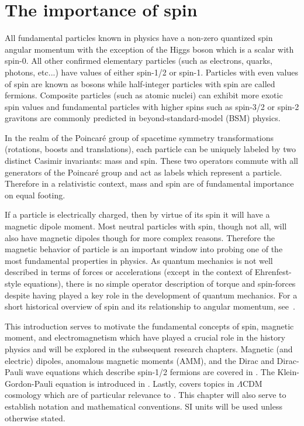 \chapter{The importance of spin}
\label{chap:intro}
\noindent All fundamental particles known in physics have a non-zero quantized spin angular momentum with the exception of the Higgs boson which is a scalar with spin-0. All other confirmed elementary particles (such as electrons, quarks, photons, etc...) have values of either spin-1/2 or spin-1. Particles with even values of spin are known as bosons while half-integer particles with spin are called fermions. Composite particles (such as atomic nuclei) can exhibit more exotic spin values and fundamental particles with higher spins such as spin-3/2 or spin-2 gravitons are commonly predicted in beyond-standard-model (BSM) physics.

In the realm of the Poincar{\'e} group of spacetime symmetry transformations (rotations, boosts and translations), each particle can be uniquely labeled by two distinct Casimir invariants: mass and spin. These two operators commute with all generators of the Poincar{\'e} group and act as labels which represent a particle. Therefore in a relativistic context, mass and spin are of fundamental importance on equal footing.

If a particle is electrically charged, then by virtue of its spin it will have a magnetic dipole moment. Most neutral particles with spin, though not all, will also have magnetic dipoles though for more complex reasons. Therefore the magnetic behavior of particle is an important window into probing one of the most fundamental properties in physics. As quantum mechanics is not well described in terms of forces or accelerations (except in the context of Ehrenfest-style equations), there is no simple operator description of torque and spin-forces despite having played a key role in the development of quantum mechanics. For a short historical overview of spin and its relationship to angular momentum, see~\cite{Ohanian:1986wg}.

This introduction serves to motivate the fundamental concepts of spin, magnetic moment, and electromagnetism which have played a crucial role in the history physics and will be explored in the subsequent research chapters. Magnetic (and electric) dipoles, anomalous magnetic moments (AMM), and the Dirac and Dirac-Pauli wave equations which describe spin-1/2 fermions are covered in . The Klein-Gordon-Pauli equation is introduced in . Lastly,  covers topics in $\Lambda\mathrm{CDM}$ cosmology which are of particular relevance to . This chapter will also serve to establish notation and mathematical conventions. SI units will be used unless otherwise stated.

